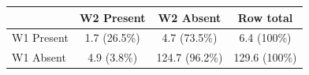 \begin{tabular}{lccc}
\toprule
 & W2 Present & W2 Absent & Row total \\
\midrule
W1 Present & 1.7 (26.5\%) & 4.7 (73.5\%) & 6.4 (100\%) \\
W1 Absent  & 4.9 (3.8\%) & 124.7 (96.2\%) & 129.6 (100\%) \\
\bottomrule
\end{tabular}